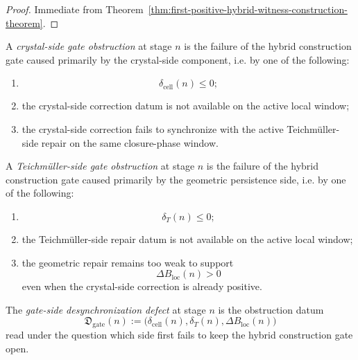 \begin{proof}
Immediate from Theorem~\ref{thm:first-positive-hybrid-witness-construction-theorem}.
\end{proof}


\begin{definition}
\label{def:crystal-side-gate-obstruction}
A \emph{crystal-side gate obstruction} at stage $n$ is the failure of the hybrid construction gate caused primarily by the crystal-side component, i.e. by one of the following:
\begin{enumerate}[leftmargin=2em,label=(\alph*)]
  \item
  \[
    \delta_{\mathrm{cell}}(n)\le 0;
  \]
  \item the crystal-side correction datum is not available on the active local window;
  \item the crystal-side correction fails to synchronize with the active Teichm\"uller-side repair on the same closure-phase window.
\end{enumerate}
\end{definition}

\begin{definition}
\label{def:teichmueller-side-gate-obstruction}
A \emph{Teichm\"uller-side gate obstruction} at stage $n$ is the failure of the hybrid construction gate caused primarily by the geometric persistence side, i.e. by one of the following:
\begin{enumerate}[leftmargin=2em,label=(\alph*)]
  \item
  \[
    \delta_T(n)\le 0;
  \]
  \item the Teichm\"uller-side repair datum is not available on the active local window;
  \item the geometric repair remains too weak to support
  \[
    \Delta B_{\mathrm{loc}}(n)>0
  \]
  even when the crystal-side correction is already positive.
\end{enumerate}
\end{definition}

\begin{definition}
\label{def:gate-side-desynchronization-defect}
The \emph{gate-side desynchronization defect} at stage $n$ is the obstruction datum
\[
  \mathfrak D_{\mathrm{gate}}(n)
  :=
  \bigl(
    \delta_{\mathrm{cell}}(n),
    \delta_T(n),
    \Delta B_{\mathrm{loc}}(n)
  \bigr)
\]
read under the question which side first fails to keep the hybrid construction gate open.
\end{definition}

